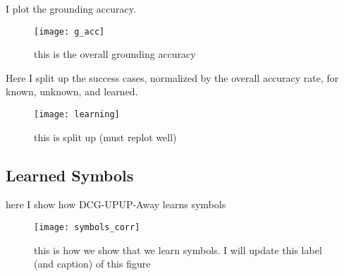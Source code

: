 I plot the grounding accuracy.
\begin{figure}[h]
\centering
\texttt{[image: g\_acc]}
\caption{this is the overall grounding accuracy}
\label{fig:g_acc}
\end{figure}

Here I split up the success cases, normalized by the overall accuracy rate, for known, unknown, and learned.
\begin{figure}[h]
\centering
\texttt{[image: learning]}
\caption{this is split up (must replot well)}
\label{fig:g_acc}
\end{figure}


\subsection{Learned Symbols}
here I show how DCG-UPUP-Away learns symbols
\begin{figure}[h]
\centering
\texttt{[image: symbols\_corr]}
\caption{this is how we show that we learn symbols. I will update this label (and caption) of this figure}
\label{fig:g_acc}
\end{figure}

